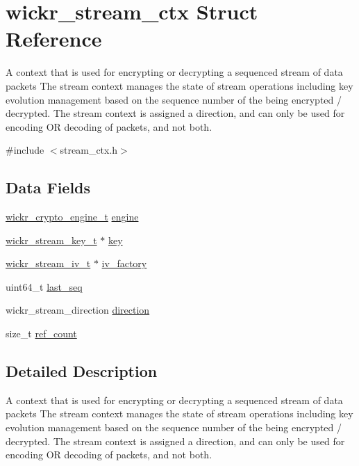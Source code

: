 \hypertarget{structwickr__stream__ctx}{}\section{wickr\+\_\+stream\+\_\+ctx Struct Reference}
\label{structwickr__stream__ctx}


A context that is used for encrypting or decrypting a sequenced stream of data packets The stream context manages the state of stream operations including key evolution management based on the sequence number of the being encrypted / decrypted. The stream context is assigned a direction, and can only be used for encoding OR decoding of packets, and not both.  




{\ttfamily \#include $<$stream\+\_\+ctx.\+h$>$}

\subsection*{Data Fields}
\begin{DoxyCompactItemize}
\item 
\hyperlink{structwickr__crypto__engine}{wickr\+\_\+crypto\+\_\+engine\+\_\+t} \hyperlink{structwickr__stream__ctx_a14ef322bbeec579ded7f35c5aeb0d3fa}{engine}
\item 
\hyperlink{structwickr__stream__key}{wickr\+\_\+stream\+\_\+key\+\_\+t} $\ast$ \hyperlink{structwickr__stream__ctx_a3598b3c0415d13fafab6633f8c00a3c8}{key}
\item 
\hyperlink{structwickr__stream__iv}{wickr\+\_\+stream\+\_\+iv\+\_\+t} $\ast$ \hyperlink{structwickr__stream__ctx_a67c5066e87dbdc026358563daa51f174}{iv\+\_\+factory}
\item 
uint64\+\_\+t \hyperlink{structwickr__stream__ctx_abf2c6ab54e1663e6a47e310fd68b3b3f}{last\+\_\+seq}
\item 
wickr\+\_\+stream\+\_\+direction \hyperlink{structwickr__stream__ctx_a34c622c3ca61348321261ee7a9c3ff91}{direction}
\item 
size\+\_\+t \hyperlink{structwickr__stream__ctx_aa0e74b2c117666501373a5947d92e8c4}{ref\+\_\+count}
\end{DoxyCompactItemize}


\subsection{Detailed Description}
A context that is used for encrypting or decrypting a sequenced stream of data packets The stream context manages the state of stream operations including key evolution management based on the sequence number of the being encrypted / decrypted. The stream context is assigned a direction, and can only be used for encoding OR decoding of packets, and not both. 

